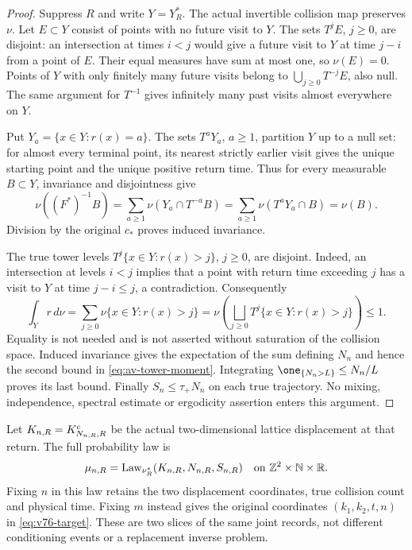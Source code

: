 \begin{proof}
Suppress $R$ and write $Y=Y_R^*$.  The actual invertible collision
map preserves $\nu$.  Let $E\subset Y$ consist of points with no
future visit to $Y$.  The sets $T^jE$, $j\ge0$, are disjoint: an
intersection at times $i<j$ would give a future visit to $Y$ at time
$j-i$ from a point of $E$.  Their equal measures have sum at most
one, so $\nu(E)=0$.  Points of $Y$ with only finitely many future
visits belong to $\bigcup_{j\ge0}T^{-j}E$, also null.  The same
argument for $T^{-1}$ gives infinitely many past visits almost
everywhere on $Y$.

Put $Y_a=\{x\in Y:r(x)=a\}$.  The sets $T^aY_a$, $a\ge1$,
partition $Y$ up to a null set: for almost every terminal point,
its nearest strictly earlier visit gives the unique starting point
and the unique positive return time.  Thus for every measurable
$B\subset Y$, invariance and disjointness give
\[
 \nu((F^*)^{-1}B)=\sum_{a\ge1}\nu(Y_a\cap T^{-a}B)
 =\sum_{a\ge1}\nu(T^aY_a\cap B)=\nu(B).
\]
Division by the original $c_*$ proves induced invariance.

The true tower levels $T^j\{x\in Y:r(x)>j\}$, $j\ge0$, are
disjoint.  Indeed, an intersection at levels $i<j$ implies that a
point with return time exceeding $j$ has a visit to $Y$ at time
$j-i\le j$, a contradiction.  Consequently
\[
 \int_Yr\,d\nu=\sum_{j\ge0}\nu\{x\in Y:r(x)>j\}
 =\nu\!\left(\bigsqcup_{j\ge0}T^j\{x\in Y:r(x)>j\}\right)
 \le1.
\]
Equality is not needed and is not asserted without saturation of
the collision space.  Induced invariance gives the expectation of
the sum defining $N_n$ and hence the second bound in
\eqref{eq:av-tower-moment}.  Integrating
$\one_{\{N_n>L\}}\le N_n/L$ proves its last bound.
Finally $S_n\le\tau_+N_n$ on each true trajectory.  No mixing,
independence, spectral estimate or ergodicity assertion enters this
argument.
\end{proof}

Let $K_{n,R}=K^{\rm c}_{N_{n,R},R}$ be the actual two-dimensional
lattice displacement at that return.  The full probability law is
\begin{equation}\label{eq:av-return-law}
 \mu_{n,R}=\operatorname{Law}_{\nu_R^*}
                   (K_{n,R},N_{n,R},S_{n,R})
       \quad\hbox{on }\mathbb Z^2\times\mathbb N\times\mathbb R.
\end{equation}
Fixing $n$ in this law retains the two displacement coordinates, true
collision count and physical time.  Fixing $m$ instead gives the
original coordinates $(k_1,k_2,t,n)$ in \eqref{eq:v76-target}.
These are two slices of the same joint records, not different
conditioning events or a replacement inverse problem.

